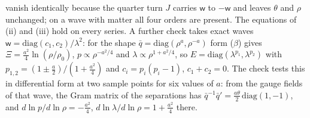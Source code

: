 vanish identically because the quarter turn $J$ carries $\mathsf{w}$ to $-\mathsf{w}$ and leaves $\theta$ and $\rho$ unchanged; on a wave with matter all four orders are present. The equations of (ii) and (iii) hold on every series. A further check takes exact waves $\mathsf{w} = \mathrm{diag}(c_{1}, c_{2})/\lambda^{2}$: for the shape $\bar q = \mathrm{diag}(\rho^{a}, \rho^{-a})$ form ($\beta$) gives $\Xi = \tfrac{a^{2}}{4}\ln(\rho/\rho_{0})$, $p \propto \rho^{-a^{2}/4}$ and $\lambda \propto \rho^{1 + a^{2}/4}$, so $E = \mathrm{diag}(\lambda^{p_{1}}, \lambda^{p_{2}})$ with $p_{1,2} = (1 \pm \tfrac{a}{2})/(1 + \tfrac{a^{2}}{4})$ and $c_{i} = p_{i}(p_{i} - 1)$, $c_{1} + c_{2} = 0$. The check tests this in differential form at two sample points for six values of $a$: from the gauge fields of that wave, the Gram matrix of the separations has $\bar q^{-1}\bar q' = \tfrac{a\theta}{2}\,\mathrm{diag}(1, -1)$, and $d\ln p/d\ln\rho = -\tfrac{a^{2}}{4}$, $d\ln\lambda/d\ln\rho = 1 + \tfrac{a^{2}}{4}$ there.

